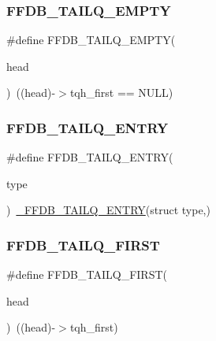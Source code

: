 \subsubsection{\texorpdfstring{FFDB\_TAILQ\_EMPTY}{FFDB\_TAILQ\_EMPTY}}
{\footnotesize\ttfamily \#define F\+F\+D\+B\+\_\+\+T\+A\+I\+L\+Q\+\_\+\+E\+M\+P\+TY(\begin{DoxyParamCaption}\item[{}]{head }\end{DoxyParamCaption})~((head)-\/$>$tqh\+\_\+first == N\+U\+LL)}

\mbox{\label{adat-devel_2other__libs_2filedb_2filehash_2ffdb__cq_8h_a7df02f20720d1790ccb6f535c27127cc}} 
\subsubsection{\texorpdfstring{FFDB\_TAILQ\_ENTRY}{FFDB\_TAILQ\_ENTRY}}
{\footnotesize\ttfamily \#define F\+F\+D\+B\+\_\+\+T\+A\+I\+L\+Q\+\_\+\+E\+N\+T\+RY(\begin{DoxyParamCaption}\item[{}]{type }\end{DoxyParamCaption})~\mbox{\hyperlink{adat__devel_2other__libs_2filedb_2filehash_2ffdb__cq_8h_aad2af737f8a9c9f8bd45313ae2813a24}{\+\_\+\+F\+F\+D\+B\+\_\+\+T\+A\+I\+L\+Q\+\_\+\+E\+N\+T\+RY}}(struct type,)}

\mbox{\label{adat-devel_2other__libs_2filedb_2filehash_2ffdb__cq_8h_a8e7270cbf095144ce693997be142d401}} 
\subsubsection{\texorpdfstring{FFDB\_TAILQ\_FIRST}{FFDB\_TAILQ\_FIRST}}
{\footnotesize\ttfamily \#define F\+F\+D\+B\+\_\+\+T\+A\+I\+L\+Q\+\_\+\+F\+I\+R\+ST(\begin{DoxyParamCaption}\item[{}]{head }\end{DoxyParamCaption})~((head)-\/$>$tqh\+\_\+first)}

\mbox{\label{adat-devel_2other__libs_2filedb_2filehash_2ffdb__cq_8h_a0f03d1b96196c22082a2f2cb96498e47}} 
